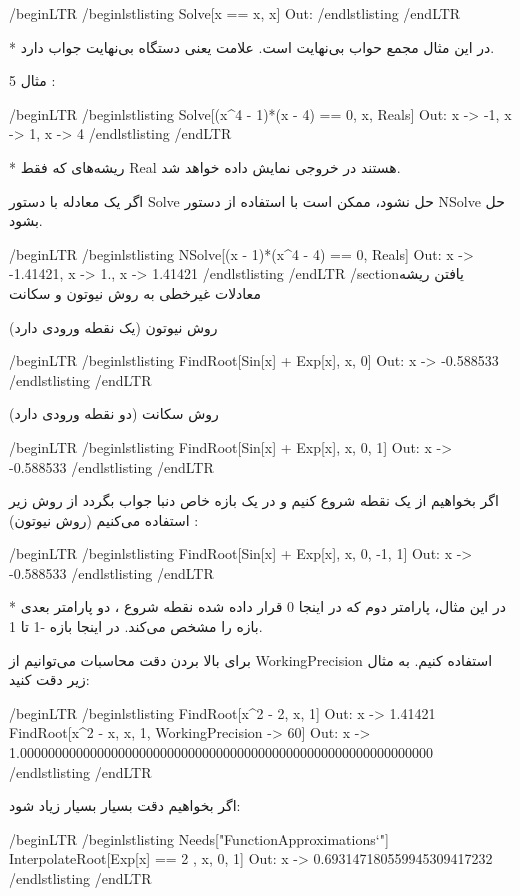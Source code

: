 /begin{LTR}
/begin{lstlisting}
Solve[x == x, x]         Out: {{}}
/end{lstlisting}
/end{LTR}

* در این مثال مجمع حواب بی‌نهایت است. علامت {{}} یعنی دستگاه بی‌نهایت جواب دارد.

مثال 5 :

/begin{LTR}
/begin{lstlisting}
Solve[(x^4 - 1)*(x - 4) == 0, x, Reals]         Out: {{x -> -1}, {x -> 1}, {x -> 4}}
/end{lstlisting}
/end{LTR}

* ریشه‌های که فقط Real هستند در خروجی نمایش داده خواهد شد.

اگر یک معادله با دستور Solve حل نشود، ممکن است با استفاده از دستور NSolve حل بشود.

/begin{LTR}
/begin{lstlisting}
NSolve[(x - 1)*(x^4 - 4) == 0, Reals]        Out: {{x -> -1.41421}, {x -> 1.}, {x -> 1.41421}}
/end{lstlisting}
/end{LTR}
/section{یافتن ریشه معادلات غیرخطی به روش نیوتون و سکانت}

روش نیوتون (یک نقطه ورودی دارد)

/begin{LTR}
/begin{lstlisting}
FindRoot[Sin[x] + Exp[x], {x, 0}]       Out: {x -> -0.588533}
/end{lstlisting}
/end{LTR}

روش سکانت (دو نقطه ورودی دارد)

/begin{LTR}
/begin{lstlisting}
FindRoot[Sin[x] + Exp[x], {x, 0, 1}]       Out: {x -> -0.588533}
/end{lstlisting}
/end{LTR}

اگر بخواهیم از یک نقطه شروع کنیم و در یک بازه خاص دنبا جواب بگردد از روش زیر استفاده می‌کنیم (روش نیوتون) :

/begin{LTR}
/begin{lstlisting}
FindRoot[Sin[x] + Exp[x], {x, 0, -1, 1}]      Out: {x -> -0.588533}
/end{lstlisting}
/end{LTR}

* در این مثال، پارامتر دوم که در اینجا 0 قرار داده شده نقطه شروع ، دو پارامتر بعدی بازه را مشخص می‌کند. در اینجا بازه -1 تا 1.

برای بالا بردن دقت محاسبات می‌توانیم از WorkingPrecision استفاده کنیم. به مثال زیر دقت کنید:

/begin{LTR}
/begin{lstlisting}
FindRoot[x^2 - 2, {x, 1}]          Out: {x -> 1.41421}
FindRoot[x^2 - x, {x, 1}, WorkingPrecision -> 60]   Out: {x -> 1.00000000000000000000000000000000000000000000000000000000000}
/end{lstlisting}
/end{LTR}

اگر بخواهیم دقت بسیار بسیار زیاد شود:

/begin{LTR}
/begin{lstlisting}
Needs["FunctionApproximations`"]
InterpolateRoot[Exp[x] == 2 , {x, 0, 1}]   Out: {x -> 0.693147180559945309417232}
/end{lstlisting}
/end{LTR}

